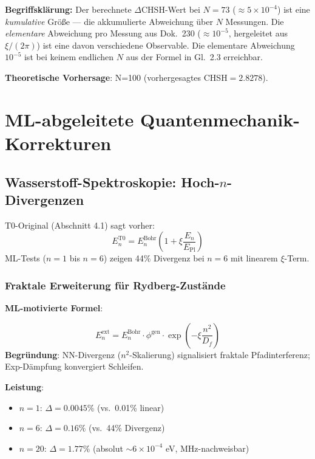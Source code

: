 	\textbf{Begriffsklärung:} Der berechnete $\Delta\text{CHSH}$-Wert bei $N = 73$
	($\approx 5 \times 10^{-4}$) ist eine \emph{kumulative} Größe — die akkumulierte
	Abweichung über $N$ Messungen. Die \emph{elementare} Abweichung pro Messung
	aus Dok.~230 ($\approx 10^{-5}$, hergeleitet aus $\xi/(2\pi)$) ist eine
	davon verschiedene Observable. Die elementare Abweichung $10^{-5}$ ist bei
	keinem endlichen $N$ aus der Formel in Gl.~2.3 erreichbar.
	

	\textbf{Theoretische Vorhersage}: N=100 (vorhergesagtes CHSH$=2.8278$).
	
	\section{ML-abgeleitete Quantenmechanik-Korrekturen}
	
	\subsection{Wasserstoff-Spektroskopie: Hoch-$n$-Divergenzen}
	
	T0-Original (Abschnitt 4.1) sagt vorher:
	\begin{equation}
		E_n^{\text{T0}} = E_n^{\text{Bohr}} \left(1 + \xi \frac{E_n}{E_{\text{Pl}}}\right) \tag{T0-Orig Gl.~4.1.2}
	\end{equation}
	ML-Tests ($n=1$ bis $n=6$) zeigen 44\% Divergenz bei $n=6$ mit linearem $\xi$-Term.
	
	\subsubsection{Fraktale Erweiterung für Rydberg-Zustände}
	
	\textbf{ML-motivierte Formel}:
	\begin{tcolorbox}[colback=magenta!5!white,colframe=magenta!75!black,title={ML-erweiterte Rydberg-Energie}]
		\begin{equation}
			E_n^{\text{ext}} = E_n^{\text{Bohr}} \cdot \phi^{\text{gen}} \cdot \exp\left(-\xi \frac{n^2}{D_f}\right) \tag{ML-Gl.~3.1}
		\end{equation}
		\textbf{Begründung}: NN-Divergenz ($n^2$-Skalierung) signalisiert fraktale Pfadinterferenz; Exp-Dämpfung konvergiert Schleifen.
	\end{tcolorbox}
	
	\textbf{Leistung}:
	\begin{itemize}
		\item $n=1$: $\Delta=0.0045\%$ (vs.~0.01\% linear)
		\item $n=6$: $\Delta=0.16\%$ (vs.~44\% Divergenz)
		\item $n=20$: $\Delta=1.77\%$ (absolut $\sim6\times10^{-4}$ eV, MHz-nachweisbar)
	\end{itemize}
	
